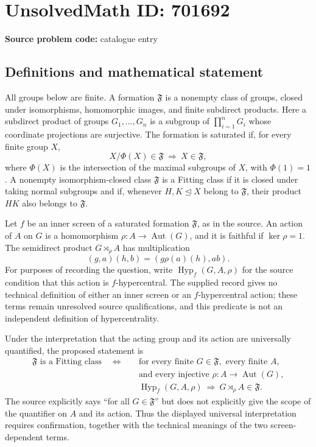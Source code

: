 \documentclass[11pt]{article}
\begin{document}
\section*{UnsolvedMath ID: 701692}
\textbf{Source problem code:} catalogue entry
\subsection{Definitions and mathematical statement}
All groups below are finite. A formation \(\mathfrak F\) is a nonempty class of groups, closed under isomorphisms, homomorphic images, and finite subdirect products. Here a subdirect product of groups \(G_1,\ldots,G_n\) is a subgroup of \(\prod_{i=1}^nG_i\) whose coordinate projections are surjective. The formation is saturated if, for every finite group \(X\),
\[
X/\Phi(X)\in\mathfrak F\ \Longrightarrow\ X\in\mathfrak F,
\]
where \(\Phi(X)\) is the intersection of the maximal subgroups of \(X\), with \(\Phi(1)=1\). A nonempty isomorphism-closed class \(\mathfrak F\) is a Fitting class if it is closed under taking normal subgroups and if, whenever \(H,K\trianglelefteq X\) belong to \(\mathfrak F\), their product \(HK\) also belongs to \(\mathfrak F\).

Let \(f\) be an inner screen of a saturated formation \(\mathfrak F\), as in the source. An action of \(A\) on \(G\) is a homomorphism \(\rho:A\to\operatorname{Aut}(G)\), and it is faithful if \(\ker\rho=1\). The semidirect product \(G\rtimes_\rho A\) has multiplication
\[
(g,a)(h,b)=(g\rho(a)(h),ab).
\]
For purposes of recording the question, write \(\operatorname{Hyp}_f(G,A,\rho)\) for the source condition that this action is \(f\)-hypercentral. The supplied record gives no technical definition of either an inner screen or an \(f\)-hypercentral action; these terms remain unresolved source qualifications, and this predicate is not an independent definition of hypercentrality.

Under the interpretation that the acting group and its action are universally quantified, the proposed statement is
\[
\begin{aligned}
\mathfrak F\text{ is a Fitting class}
\quad\Longleftrightarrow\quad
&\text{for every finite }G\in\mathfrak F,\text{ every finite }A,\\
&\text{and every injective }\rho:A\to\operatorname{Aut}(G),\\
&\operatorname{Hyp}_f(G,A,\rho)
\ \Longrightarrow\ G\rtimes_\rho A\in\mathfrak F.
\end{aligned}
\]
The source explicitly says ``for all \(G\in\mathfrak F\)'' but does not explicitly give the scope of the quantifier on \(A\) and its action. Thus the displayed universal interpretation requires confirmation, together with the technical meanings of the two screen-dependent terms.
\end{document}
